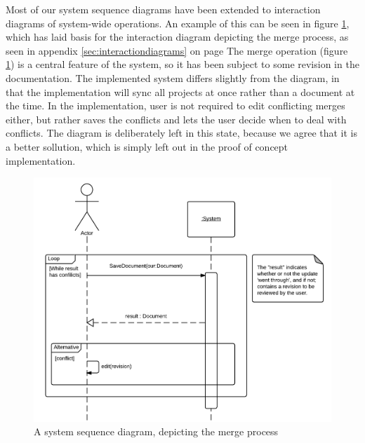 Most of our system sequence diagrams have been extended to interaction diagrams of system-wide operations. 
An example of this can be seen in figure \ref{fig:merge-ssd}, 
which has laid basis for the interaction diagram depicting the merge process, 
as seen in appendix \ref{sec:interactiondiagrams} on page \pageref{fig:interaction-merge-diagram}
The merge operation (figure \ref{fig:merge-ssd}) is a central feature of the \SOP 
system, so it has been subject to some revision in the documentation.
The implemented system differs slightly from the diagram, in that the implementation will sync all projects at once rather than a document at the time. 
In the implementation, user is not required to edit conflicting merges either, but rather 
saves the conflicts and lets the user decide when to deal with conflicts.
The diagram is deliberately left in this state, because we agree that it is a better sollution, which is simply left out in the proof of concept \SOP implementation.

\begin{figure}[hbt]
	\centering
	\includegraphics[width=1\textwidth]{Software_analysis/graphics/Merge-ssd.png}
	\caption{A system sequence diagram, depicting the merge process}
	\label{fig:merge-ssd}
\end{figure}
